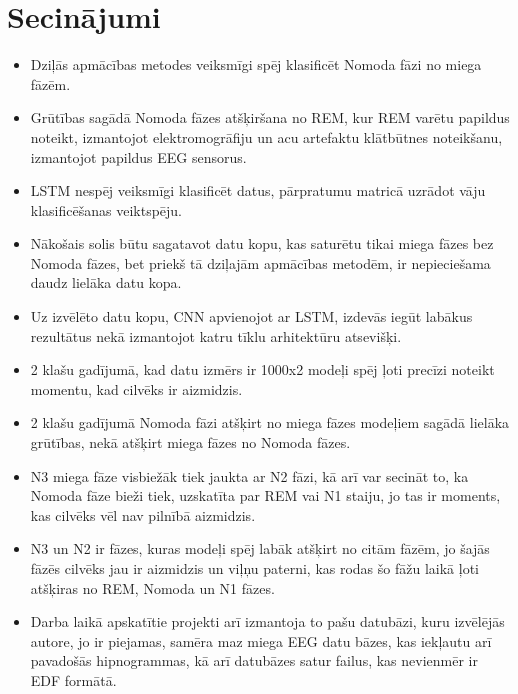 \documentclass[12pt,paper=A4]{report}
\begin{document}
\chapter*{Secinājumi}
\begin{itemize}
\item Dziļās apmācības metodes veiksmīgi spēj klasificēt Nomoda fāzi no miega fāzēm.
 \item Grūtības sagādā Nomoda fāzes atšķiršana no REM, kur REM varētu papildus noteikt, izmantojot elektromogrāfiju un acu artefaktu klātbūtnes noteikšanu, izmantojot papildus EEG sensorus. 
 \item LSTM nespēj veiksmīgi klasificēt datus, pārpratumu matricā uzrādot vāju klasificēšanas veiktspēju.
\item Nākošais solis būtu sagatavot datu kopu, kas saturētu tikai miega fāzes bez Nomoda fāzes, bet priekš tā dziļajām apmācības metodēm, ir nepieciešama daudz lielāka datu kopa.
\item Uz izvēlēto datu kopu, CNN apvienojot ar LSTM, izdevās iegūt labākus rezultātus nekā izmantojot katru tīklu arhitektūru atsevišķi.
\item 2 klašu gadījumā, kad datu izmērs ir 1000x2 modeļi spēj ļoti precīzi noteikt momentu, kad cilvēks ir aizmidzis. 
\item 2 klašu gadījumā Nomoda fāzi atšķirt no miega fāzes modeļiem sagādā lielāka grūtības, nekā atšķirt miega fāzes no Nomoda fāzes. 
\item N3 miega fāze visbiežāk tiek jaukta ar N2 fāzi, kā arī var secināt to, ka Nomoda fāze bieži tiek, uzskatīta par REM vai N1 staiju, jo tas ir moments, kas cilvēks vēl nav pilnībā aizmidzis. 
\item N3 un N2 ir fāzes, kuras modeļi spēj labāk atšķirt no citām fāzēm, jo šajās fāzēs cilvēks jau ir aizmidzis un viļņu paterni, kas rodas šo fāžu laikā ļoti atšķiras no REM, Nomoda un N1 fāzes. 
\item Darba laikā apskatītie projekti arī izmantoja to pašu datubāzi, kuru izvēlējās autore, jo ir piejamas, samēra maz miega EEG datu bāzes, kas iekļautu arī pavadošās hipnogrammas, kā arī datubāzes satur failus, kas nevienmēr ir EDF formātā.  
\end{itemize}

 

\end{document}
